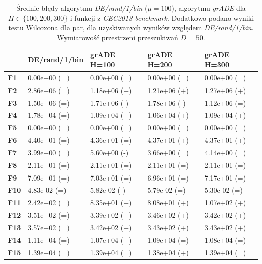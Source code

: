 \documentclass[12pt,a4paper]{report}
\begin{document}
{{{{{{{\begin{table}[h]
\centering
\caption{Średnie błędy algorytmu \emph{DE/rand/1/bin} ($\mu = 100$), algorytmu \emph{grADE} dla $H \in \{100, 200, 300\}$ i funkcji z \emph{CEC2013 benchmark}. Dodatkowo podano wyniki testu Wilcoxona dla par, dla uzyskiwanych wyników względem \emph{DE/rand/1/bin}. Wymiarowość przestrzeni przeszukiwań $D = 50$.}
\label{Anal19}
\begin{tabular}{|l|l|l|l|l|}
\hline
          & {\bf DE/rand/1/bin} & {\bf grADE H=100} & {\bf grADE H=200} & {\bf grADE H=300} \\ \hline
{\bf F1}  & 0.00e+00 (=)        & 0.00e+00 (=)     & 0.00e+00 (=)      & 0.00e+00 (=)      \\ \hline
{\bf F2}  & 2.86e+06 (=)        & 1.18e+06 (+)     & 1.21e+06 (+)      & 1.27e+06 (+)      \\ \hline
{\bf F3}  & 1.50e+06 (=)        & 1.71e+06 (-)     & 1.78e+06 (-)      & 1.12e+06 (=)      \\ \hline
{\bf F4}  & 1.78e+04 (=)        & 1.09e+04 (+)     & 1.06e+04 (+)      & 1.09e+04 (+)      \\ \hline
{\bf F5}  & 0.00e+00 (=)        & 0.00e+00 (=)     & 0.00e+00 (=)      & 0.00e+00 (=)      \\ \hline
{\bf F6}  & 4.40e+01 (=)        & 4.36e+01 (=)     & 4.37e+01 (+)      & 4.37e+01 (+)      \\ \hline
{\bf F7}  & 3.99e+00 (=)        & 5.60e+00 (-)     & 3.66e+00 (=)      & 4.14e+00 (=)      \\ \hline
{\bf F8}  & 2.11e+01 (=)        & 2.11e+01 (=)     & 2.11e+01 (=)      & 2.11e+01 (=)      \\ \hline
{\bf F9}  & 7.09e+01 (=)        & 7.03e+01 (=)     & 6.96e+01 (=)      & 7.17e+01 (=)      \\ \hline
{\bf F10} & 4.83e-02 (=)        & 5.82e-02 (-)     & 5.79e-02 (=)      & 5.30e-02 (=)      \\ \hline
{\bf F11} & 2.42e+02 (=)        & 8.35e+01 (+)     & 8.08e+01 (+)      & 1.07e+02 (+)      \\ \hline
{\bf F12} & 3.51e+02 (=)        & 3.39e+02 (+)     & 3.46e+02 (+)      & 3.42e+02 (+)      \\ \hline
{\bf F13} & 3.57e+02 (=)        & 3.42e+02 (+)     & 3.43e+02 (+)      & 3.43e+02 (+)      \\ \hline
{\bf F14} & 1.11e+04 (=)        & 1.07e+04 (+)     & 1.09e+04 (=)      & 1.08e+04 (=)      \\ \hline
{\bf F15} & 1.39e+04 (=)        & 1.39e+04 (=)     & 1.38e+04 (+)      & 1.39e+04 (=)      \\ \hline

\end{tabular}
\end{table}}}}}}}}
\end{document}
